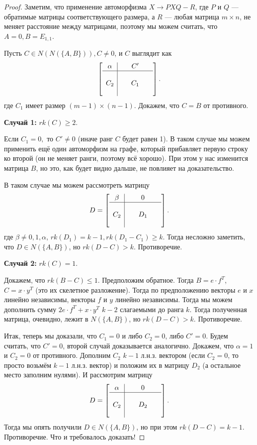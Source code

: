 \documentclass{article}
\begin{document}
\begin{proof}
Заметим, что применение автоморфизма $X \rightarrow PXQ - R$, где $P$ и $Q$ — обратимые матрицы соответствующего размера, а $R$ — любая матрица $m \times n$, не меняет расстояние между матрицами, поэтому мы можем считать, что $A = 0, B = E_{1, 1}$.


Пусть $C \in N(N(\{A, B\})), C \ne 0$, и $C$ выглядит как \[
\left[
\begin{array}{c|ccc}
\alpha & \phantom{0} & C' & \phantom{0} \\ 
\hline \\
C_2 & \phantom{0} & C_1 \\
\phantom{0}
\end{array}
\right].
\]
где $C_1$ имеет размер $(m - 1) \times (n - 1)$. Докажем, что $C = B$ от противного. 

\textbf{Случай 1:} $rk(C) \ge 2$.

Если $C_1 = 0,$ то $C' \ne 0$ (иначе ранг $C$ будет равен 1). В таком случае мы можем применить ещё один автоморфизм на графе, который прибавляет первую строку ко второй (он не меняет ранги, поэтому всё хорошо). При этом у нас изменится матрица $B$, но это, как будет видно дальше, не повлияет на доказательство.

    В таком случае мы можем рассмотреть матрицу \[
D = 
\left[
\begin{array}{c|ccc}
\beta & \phantom{0} & 0 & \phantom{0} \\ 
\hline \\
C_2 & \phantom{0} & D_1 \\
\phantom{0}
\end{array}
\right].
\]
где $\beta \ne 0, 1, \alpha$, $rk(D_1) = k - 1, rk(D_1 - C_1) \ge k$. Тогда несложно заметить, что $D \in N(\{A, B\})$, но $rk(D - C) > k$. Противоречие.

\textbf{Случай 2:} $rk(C) = 1$.

Докажем, что $rk(B - C) \le 1$. Предположим обратное. Тогда $B = e \cdot f^T$, $C = x \cdot y^T$
 (это их скелетное разложение). Тогда по предположению векторы $e$ и $x$ линейно независимы, векторы $f$ и $y$ линейно независимы. Тогда мы можем дополнить сумму $2e \cdot f^T + x \cdot y^T$ $k-2$ слагаемыми до ранга $k$. Тогда полученная матрица, очевидно, лежит в $N(\{A, B\})$, но $rk(D - C) > k$. Противоречие.

Итак, теперь мы доказали, что $C_1 = 0$ и либо $C_2 = 0$, либо $C' = 0$. Будем считать, что $C' = 0$, второй случай доказывается аналогично. Докажем, что $\alpha = 1$ и $C_2 = 0$ от противного. Дополним $C_2$ $k-1$ л.н.з. вектором (если $C_2 = 0$, то просто возьмём $k - 1$ л.н.з. вектор) и положим их в матрицу $D_2$ (а остальное место заполним нулями). И рассмотрим матрицу \[
D = 
\left[
\begin{array}{c|ccc}
\alpha & \phantom{0} & 0 & \phantom{0} \\ 
\hline \\
C_2 & \phantom{0} & D_2 \\
\phantom{0}
\end{array}
\right].
\]
Тогда мы опять получили $D \in N(\{A, B\})$, но при этом $rk(D - C) = k - 1$. Противоречие.
Что и требовалось доказать!
\end{proof}
\end{document}
